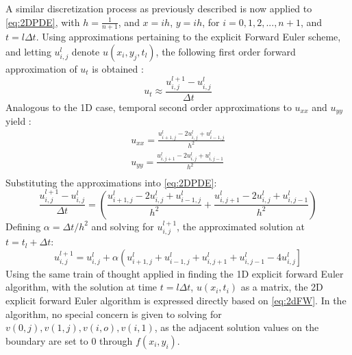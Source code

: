 \documentclass[%
oneside,                 %
final,                   %
10pt]{article}
\begin{document}
A similar discretization process as previously described is now applied to \eqref{eq:2DPDE}, with $h=\frac{1}{n+1}$, and $x=ih$, $y=ih$, for $i=0,1,2,...,n+1$, and $t=l \Delta t$. Using approximations pertaining to the explicit Forward Euler scheme, and letting $u_{i,j}^l$ denote $u(x_i,y_j,t_l)$, the following first order forward approximation of $u_t$ is obtained \cite{HJ15}: 
\begin{equation}
u_t \approx \frac{u_{i,j}^{l+1}-u_{i,j}^l}{\Delta t}
\end{equation}
Analogous to the 1D case, temporal second order approximations to $u_{xx}$ and $u_{yy}$ yield \cite{HJ15}:
\begin{align}
u_{xx}=\frac{u_{i+1,j}^l-2u_{i,j}^l+u_{i-1,j}^l}{h^2} \\
u_{yy}=\frac{u_{i,j+1}^l-2u_{i,j}^l+u_{i,j-1}^l}{h^2} \\
\end{align}
Substituting the approximations into \eqref{eq:2DPDE}:
\begin{equation}
\frac{u_{i,j}^{l+1}-u_{i,j}^l}{\Delta t}=\left(\frac{u_{i+1,j}^l-2u_{i,j}^l+u_{i-1,j}^l}{h^2} +\frac{u_{i,j+1}^l-2u_{i,j}^l+u_{i,j-1}^l}{h^2}\right)
\end{equation}
Defining $\alpha=\Delta t/h^2$ and solving for $u_{i,j}^{l+1}$, the approximated solution at $t=t_l+\Delta t$:
\begin{equation}
u_{i,j}^{l+1}=u_{i,j}^{l}+\alpha\left(u_{i+1,j}^{l}+u_{i-1,j}^{l}+u_{i,j+1}^{l}+u_{i,j-1}^{l}-4u_{i,j}^{l}\right] \label{eq:2dFW}
\end{equation}
Using the same train of thought applied in finding the 1D explicit forward Euler algorithm, with the solution  at time $t=l \Delta t$, $u(x_i,t_i)$ as a matrix, the 2D explicit forward Euler algorithm is expressed directly based on \eqref{eq:2dFW}. In the algorithm, no special concern is given to  solving for $v(0,j),v(1,j),v(i,o),v(i,1)$, as the adjacent solution values on the boundary are set to $0$ through $f(x_i,y_i)$. 
\end{document}
